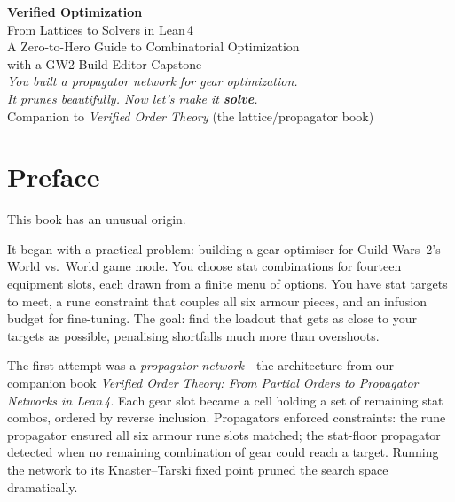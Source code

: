 \documentclass[11pt, a4paper, oneside]{book}
\begin{document}
\begin{titlepage}
\centering
\vspace*{3cm}
{\Huge\bfseries\color{deepblue} Verified Optimization\\[0.4em]}
{\LARGE\color{midblue} From Lattices to Solvers in Lean\,4\\[2em]}
{\large\color{accentgreen} A Zero-to-Hero Guide to Combinatorial Optimization\\
with a GW2 Build Editor Capstone\\[4em]}
\vfill
{\large\itshape You built a propagator network for gear optimization.\\
It prunes beautifully. Now let's make it \textbf{solve}.\\[3em]}
\vfill
{\small Companion to \emph{Verified Order Theory} (the lattice/propagator book)}
\end{titlepage}

\tableofcontents
\newpage

\chapter*{Preface}

This book has an unusual origin.

It began with a practical problem: building a gear optimiser for Guild Wars~2's
World vs.\ World game mode.  You choose stat combinations for fourteen equipment
slots, each drawn from a finite menu of options.  You have stat targets to meet,
a rune constraint that couples all six armour pieces, and an infusion budget for
fine-tuning.  The goal: find the loadout that gets as close to your targets as
possible, penalising shortfalls much more than overshoots.

The first attempt was a \emph{propagator network}---the architecture from our
companion book \emph{Verified Order Theory: From Partial Orders to Propagator
Networks in Lean\,4}.  Each gear slot became a cell holding a set of remaining
stat combos, ordered by reverse inclusion.  Propagators enforced constraints:
the rune propagator ensured all six armour rune slots matched; the stat-floor
propagator detected when no remaining combination of gear could reach a target.
Running the network to its Knaster--Tarski fixed point pruned the search space
dramatically.
\end{document}
